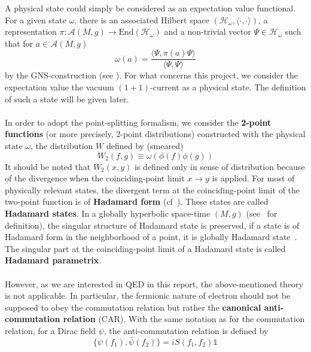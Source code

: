 A physical state could simply be considered as an expectation value functional. 
For a given state $\omega$, there is an associated Hilbert space $(\mathscr{H}_\omega, \langle \cdot, \cdot \rangle)$, a representation $\pi : \mathscr{A}(M,g)\rightarrow \mathrm{End}(\mathscr{H}_\omega)$ and a non-trivial vector $\Psi \in \mathscr{H}_\omega$ such that for $a \in \mathscr{A}(M,g)$
\begin{equation*}
\omega(a) = \frac{\langle \Psi, \pi(a)\Psi\rangle}{\langle \Psi, \Psi \rangle}
\end{equation*}
by the GNS-construction (see \eg\cite{bar2009quantum}).
For what concerns this project, we consider the expectation value the vacuum $(1+1)$-current as a physical state.
The definition of such a state will be given later. \\\\
%
In order to adopt the point-splitting formalism, 
we consider the \textbf{2-point functions} (or more precisely, 2-point distributions) constructed with the physical state $\omega$, 
\ie the distribution $W$ defined by (smeared) 
\begin{equation*}
W_2(f, g ) \equiv \omega(\phi(f) \phi(g))
\end{equation*}
It should be noted that $W_2(x,y)$ is defined only in sense of distribution because of the divergence when the coinciding-point limit $x\rightarrow y$ is applied.
For most of physically relevant states, the divergent term at the coinciding-point limit of the two-point function is of \textbf{Hadamard form} (cf~\cite{Hollands2014}).
These states are called \textbf{Hadamard states}.
In a globally hyperbolic space-time $(M,g)$ (see~\cite{Wald2010} for definition), 
the singular structure of Hadamard state is preserved, 
\ie if a state is of Hadamard form in the neighborhood of a point, it is globally Hadamard state~\cite{Fulling1978}.
The singular part at the coinciding-point limit of a Hadamard state is called \textbf{Hadamard parametrix}.  \\\\
%
However, as we are interested in QED in this report, the above-mentioned theory is not applicable. 
In particular, the fermionic nature of electron should not be supposed to obey the commutation relation but rather the \textbf{canonical anti-commutation relation} (CAR).
With the same notation as for the commutation relation, 
for a Dirac field $\psi$, the anti-commutation relation is defined by
\begin{equation*}
\{\psi(f_1), \bar{\psi}(f_2)\} = i S(f_1, f_2) \mathbb{1}
\end{equation*}
